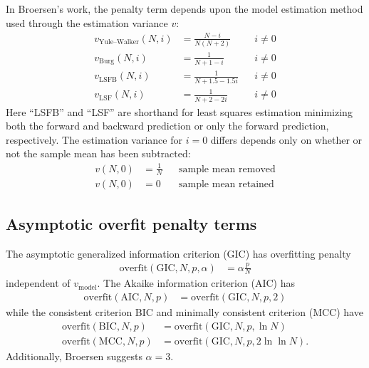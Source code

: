 \documentclass[12pt,letterpaper]{article}
\begin{document}
In Broersen's work, the penalty term depends upon the model estimation
method used through the estimation variance $v$:
\begin{subequations}
\label{eq:v1}
\begin{align}
    v_\text{Yule--Walker}\!\left(N,i\right) &= \frac{N-i}{N\left(N+2\right)}
    &
    &i \neq 0
    \\
    v_\text{Burg}\!\left(N,i\right) &= \frac{1}{N + 1 - i}
    &
    &i \neq 0
    \\
    v_\text{LSFB}\!\left(N,i\right) &= \frac{1}{N + 1.5 - 1.5i}
    &
    &i \neq 0
    \\
    v_\text{LSF}\!\left(N,i\right)  &= \frac{1}{N + 2 - 2i}
    &
    &i \neq 0
\end{align}
\end{subequations}
Here ``LSFB'' and ``LSF'' are shorthand for least squares estimation minimizing
both the forward and backward prediction or only the forward prediction,
respectively.  The estimation variance for $i=0$ differs depends only on
whether or not the sample mean has been subtracted:
\begin{subequations}
\label{eq:v0}
\begin{align}
    v\!\left(N,0\right) &= \frac{1}{N}
    &
    &\text{sample mean removed}
    \\
    v\!\left(N,0\right) &= 0
    &
    &\text{sample mean retained}
\end{align}
\end{subequations}

\subsection*{Asymptotic overfit penalty terms}

The asymptotic generalized information criterion (GIC) has overfitting penalty
\begin{align}
    \text{overfit}\!\left(\text{GIC},N,p,\alpha\right)
    &=
    \alpha \frac{p}{N}
\end{align}
independent of $v_\text{model}$.  The Akaike information criterion
(AIC) has
\begin{align}
    \label{eq:aic}
    \text{overfit}\!\left(\text{AIC},N,p\right)
    &=
    \text{overfit}\!\left(\text{GIC},N,p,2\right)
\end{align}
while the consistent criterion BIC and minimally consistent criterion
(MCC) have
\begin{align}
    \label{eq:bic}
    \text{overfit}\!\left(\text{BIC},N,p\right)
    &=
    \text{overfit}\!\left(\text{GIC},N,p,\ln{} N\right)
    \\
    \label{eq:mcc}
    \text{overfit}\!\left(\text{MCC},N,p\right)
    &=
    \text{overfit}\!\left(\text{GIC},N,p,2\ln\ln{}N\right)
    .
\end{align}
Additionally, Broersen suggests $\alpha = 3$.
\end{document}
